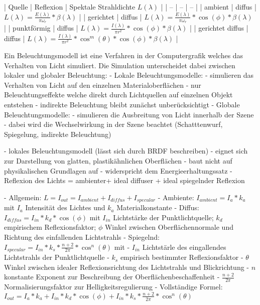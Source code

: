 \documentclass[10pt,landscape]{article}
\makeatletter
\renewcommand{\subsection}{\@startsection{subsection}{2}{0mm}%
                                {-1explus -.5ex minus -.2ex}%
                                {0.5ex plus .2ex}%
                                {\normalfont\normalsize\bfseries}}
\makeatother
\begin{document}
\begin{multicols}{3}
| Quelle | Reflexion | Spektale Strahldichte $L(\lambda)$ |
| -- | -- | -- |
| ambient | diffus | $L(\lambda)=\frac{E(\lambda)}{\pi\omega_r}*\beta(\lambda)$ |
| gerichtet | diffus | $L(\lambda)=\frac{E(\lambda)}{\pi\omega_r}*\cos(\phi)*\beta(\lambda)$ |
| punktförmig | diffus | $L(\lambda) = \frac{I(\lambda)}{\pi r^2 }*\cos(\phi)*\beta(\lambda)$ |
| gerichtet diffus | diffus | $L(\lambda)=\frac{I(\lambda)}{\pi r^2 }* \cos^m(\theta)*\cos(\phi)*\beta(\lambda)$ |


Ein Beleuchtungsmodell ist eine Verfahren in der Computergrafik welches das Verhalten von Licht simuliert. Die Simulation unterscheidet dabei zwischen lokaler und globaler Beleuchtung:
- Lokale Beleuchtungsmodelle:
  - simulieren das Verhalten von Licht auf den einzelnen Materialoberflächen
  - nur Beleuchtungseffekte welche direkt durch Lichtquellen auf einzelnen Objekt entstehen
  - indirekte Beleuchtung bleibt zunächst unberücksichtigt
- Globale Beleuchtungsmodelle:
  - simulieren die Ausbreitung von Licht innerhalb der Szene
  - dabei wird die Wechselwirkung in der Szene beachtet (Schatttenwurf, Spiegelung, indirekte Beleuchtung)

- lokales Beleuchtungsmodell (lässt sich durch BRDF beschreiben)
- eignet sich zur Darstellung von glatten, plastikähnlichen Oberflächen
- baut nicht auf physikalischen Grundlagen auf
- widerspricht dem Energieerhaltungssatz
- Reflexion des Lichts = ambienter+ ideal diffuser + ideal spiegelnder Reflexion


- Allgemein: $L=I_{out}=I_{ambient}+I_{diffus}+I_{specular}$
- Ambiente: $I_{ambient}=I_a * k_a$ mit $I_a$ Intensität des Lichtes und $k_a$ Materialkonstante
- Diffus: $I_{diffus}=I_{in}*k_d*\cos(\phi)$ mit $I_{in}$ Lichtstärke der Punktlichtquelle; $k_d$ empirischem Reflexionsfaktor; $\phi$ Winkel zwischen Oberflächennormale und Richtung des einfallenden Lichtstrahls
- Spiegelnd: $I_{specular}=I_{in}*k_s*\frac{n+2}{2\pi}*\cos^n({\theta})$ mit
  - $I_{in}$ Lichtstärle des eingallendes Lichtstrahls der Punktlichtquelle
  - $k_s$ empirisch bestimmter Reflexionsfaktor
  - $\theta$ Winkel zwischen idealer Reflexionsrichtung des Lichtstrahls und Blickrichtung
  - $n$ konstante Exponent zur Beschreibung der Oberflächenbeschaffenheit
  - $\frac{n+2}{2\pi}$ Normalisierungsfaktor zur Helligkeitsregulierung
- Vollständige Formel: $I_{out}=I_a*k_a+I_{in}*k_d*\cos(\phi)+I_{in}*k_s*\frac{n+2}{2\pi}*\cos^n(\theta)$


\end{multicols}
\end{document}
